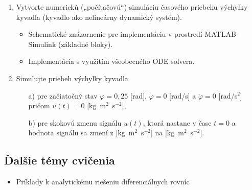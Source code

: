 \documentclass[a4paper, 10pt, ]{article}
\begin{document}
\begin{enumerate}[leftmargin=0pt, labelsep=4mm, itemsep=0pt]

	\item Vytvorte numerickú („počítačovú“) simuláciu časového priebehu výchylky kyvadla (kyvadlo ako nelineárny dynamický systém).

    \begin{itemize}[leftmargin=0pt, labelsep=4mm, itemsep=0pt]
        \item Schematické znázornenie pre implementáciu v prostredí MATLAB-Simulink (základné bloky).
        \item Implementácia s využitím všeobecného ODE solvera.
    \end{itemize}

    \item Simulujte priebeh výchylky kyvadla
    \begin{itemize}[leftmargin=0pt, labelsep=4mm, itemsep=0pt]
        \item[a)] pre začiatočný stav $\varphi = 0,25$ [rad], $\dot\varphi = 0$ [rad/s] a $\ddot\varphi = 0$ [rad/s$^{2}$] pričom $u(t) = 0$ [kg~m$^2$~s$^{-2}$],
        \item[b)] pre skokovú zmenu signálu $u(t)$, ktorá nastane v čase $t=0$ a hodnota signálu sa zmení z  [kg~m$^2$~s$^{-2}$] na  [kg~m$^2$~s$^{-2}$].
    \end{itemize}



\end{enumerate}





\subsection{Ďalšie témy cvičenia}


\begin{itemize}
    \item Príklady k analytickému riešeniu diferenciálnych rovníc
\end{itemize}
\end{document}
